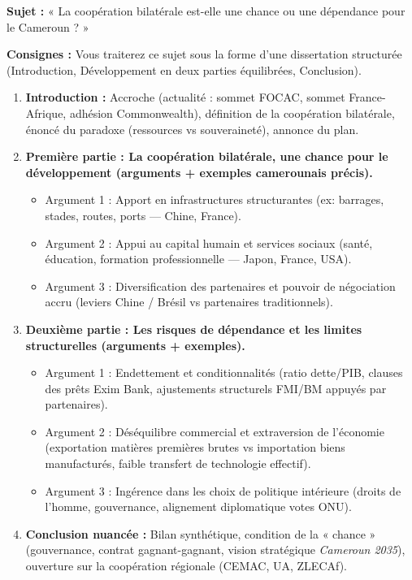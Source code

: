 \documentclass[11pt]{article}
\begin{document}
\begin{exercice}
\textbf{Sujet :} « La coopération bilatérale est-elle une chance ou une dépendance pour le Cameroun ? »

\textbf{Consignes :} Vous traiterez ce sujet sous la forme d'une dissertation structurée (Introduction, Développement en deux parties équilibrées, Conclusion).
\begin{enumerate}
\item \textbf{Introduction :} Accroche (actualité : sommet FOCAC, sommet France-Afrique, adhésion Commonwealth), définition de la coopération bilatérale, énoncé du paradoxe (ressources vs souveraineté), annonce du plan.
\item \textbf{Première partie : La coopération bilatérale, une chance pour le développement (arguments + exemples camerounais précis).} 
\begin{itemize}
\item Argument 1 : Apport en infrastructures structurantes (ex: barrages, stades, routes, ports — Chine, France).
\item Argument 2 : Appui au capital humain et services sociaux (santé, éducation, formation professionnelle — Japon, France, USA).
\item Argument 3 : Diversification des partenaires et pouvoir de négociation accru (leviers Chine / Brésil vs partenaires traditionnels).
\end{itemize}
\item \textbf{Deuxième partie : Les risques de dépendance et les limites structurelles (arguments + exemples).}
\begin{itemize}
\item Argument 1 : Endettement et conditionnalités (ratio dette/PIB, clauses des prêts Exim Bank, ajustements structurels FMI/BM appuyés par partenaires).
\item Argument 2 : Déséquilibre commercial et extraversion de l'économie (exportation matières premières brutes vs importation biens manufacturés, faible transfert de technologie effectif).
\item Argument 3 : Ingérence dans les choix de politique intérieure (droits de l'homme, gouvernance, alignement diplomatique votes ONU).
\end{itemize}
\item \textbf{Conclusion nuancée :} Bilan synthétique, condition de la « chance » (gouvernance, contrat gagnant-gagnant, vision stratégique \emph{Cameroun 2035}), ouverture sur la coopération régionale (CEMAC, UA, ZLECAf).
\end{enumerate}
\end{exercice}
\end{document}
